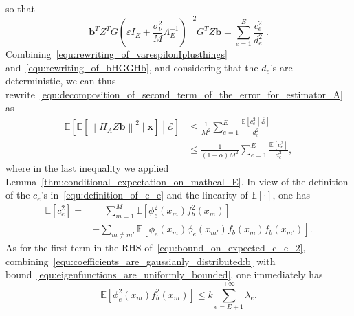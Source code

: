 \documentclass[10pt,twocolumn,twoside]{IEEEtran}					%
\theoremstyle	{plain}
\newcommand{\Expectation}					[0]	{\mathbb{E}}
\newcommand{\ExpectationOf}					[1]	{\Expectation \left[ #1 \right]}
\newcommand{\ExpectationOfGiven}			[2]	{\ExpectationOf{ #1 \; \left| \; #2 \right. }}
\newcommand	{\Lemma}				[0]	{Lemma}
\begin{document}
%
so that
%
\begin{equation}
	\bm{b}^{T} Z^{T} G\left( \varepsilon I_{E} + \frac{\sigma^{2}_{\nu}}{M} \Lambda^{-1}_{E} \right)^{-2} G^{T} Z \bm{b} 
	=
	\sum_{e = 1}^{E}
	\frac{c_{e}^{2}}{d_e^2} \; .
	\label{equ:rewriting_of_bHGGHb}
\end{equation}
%
Combining~\eqref{equ:rewriting_of_varespilonIplusthings} and~\eqref{equ:rewriting_of_bHGGHb}, and considering that the $d_{e}$'s are deterministic, we can thus rewrite~\eqref{equ:decomposition_of_second_term_of_the_error_for_estimator_A} as
%
\begin{equation}
	\begin{array}{rl}
		\displaystyle
		\ExpectationOfGiven{\ExpectationOfGiven{\left\| H_{A} Z \bm{b} \right\|^{2}}{\bm{x}}}{\overline{\mathcal{E}}}
		& \leq \displaystyle
		\frac{1}{M^{2}}
		\sum_{e = 1}^{E}
		\frac{ \ExpectationOfGiven{ c_{e}^{2} }{\overline{\mathcal{E}}}}{d_{e}^{2}} \\
		& \leq \displaystyle
		\frac{1}{(1 - \alpha) M^{2}}
		\sum_{e = 1}^{E}
		\frac{ \ExpectationOf{ c_{e}^{2} }}{d_{e}^{2}} ,
	\end{array}
	\label{equ:rewriting_of_decomposition_of_second_term_of_the_error_for_estimator_A_in_expectation}
\end{equation}
%
where in the last inequality we applied \Lemma~\ref{thm:conditional_expectation_on_mathcal_E}. In view of the definition of the $c_{e}$'s in~\eqref{equ:definition_of_c_e} and the linearity of $\ExpectationOf{\cdot}$, one has
%
\begin{equation}
	\begin{array}{ll}
		\ExpectationOf{ c_{e}^{2} }
		= & \displaystyle \phantom{+}
		\sum_{m = 1}^{M}
		\ExpectationOf
		{
			\phi_{e}^{2} \left( x_{m} \right)
			f_{b}^{2} \left( x_{m} \right)
		} \\
		& \displaystyle +
		\sum_{m \neq m'}
		\ExpectationOf
		{
			\phi_{e} \left( x_{m} \right)
			\phi_{e} \left( x_{m'} \right)
			f_{b} \left( x_{m} \right) 
			f_{b} \left( x_{m'} \right) 
		} .
	\end{array}
	\label{equ:bound_on_expected_c_e_2}
\end{equation}
%
As for the first term in the \ac{RHS} of~\eqref{equ:bound_on_expected_c_e_2}, combining~\eqref{equ:coefficients_are_gaussianly_distributed:b} with bound~\eqref{equ:eigenfunctions_are_uniformly_bounded},
one immediately has
%
\begin{equation}
	\ExpectationOf
	{
		\phi_{e}^{2} \left( x_{m} \right)
		f_{b}^{2} \left( x_{m} \right) 
	}
	\leq
	k \sum_{e = E + 1}^{+ \infty} \lambda_{e} .
	\label{equ:bound_on_expectation_of_phi_e_2_f_b_2}
\end{equation}
\end{document}
